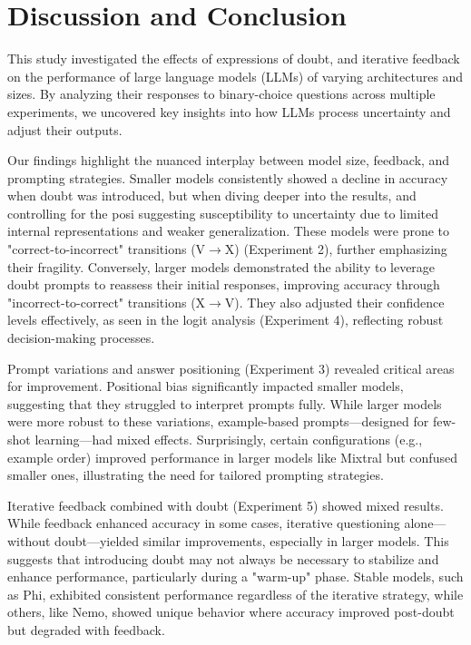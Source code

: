 \section{Discussion and Conclusion}

This study investigated the effects of expressions of doubt, and iterative feedback on the performance of large language models (LLMs) of varying architectures and sizes. By analyzing their responses to binary-choice questions across multiple experiments, we uncovered key insights into how LLMs process uncertainty and adjust their outputs.

Our findings highlight the nuanced interplay between model size, feedback, and prompting strategies. Smaller models consistently showed a decline in accuracy when doubt was introduced, but when diving deeper into the results, and controlling for the posi
 suggesting susceptibility to uncertainty due to limited internal representations and weaker generalization. These models were prone to "correct-to-incorrect" transitions (V$\to$X) (Experiment 2), further emphasizing their fragility. Conversely, larger models demonstrated the ability to leverage doubt prompts to reassess their initial responses, improving accuracy through "incorrect-to-correct" transitions (X$\to$V). They also adjusted their confidence levels effectively, as seen in the logit analysis (Experiment 4), reflecting robust decision-making processes.

Prompt variations and answer positioning (Experiment 3) revealed critical areas for improvement. Positional bias significantly impacted smaller models, suggesting that they struggled to interpret prompts fully. While larger models were more robust to these variations, example-based prompts—designed for few-shot learning—had mixed effects. Surprisingly, certain configurations (e.g., example order) improved performance in larger models like Mixtral but confused smaller ones, illustrating the need for tailored prompting strategies.

Iterative feedback combined with doubt (Experiment 5) showed mixed results. While feedback enhanced accuracy in some cases, iterative questioning alone—without doubt—yielded similar improvements, especially in larger models. This suggests that introducing doubt may not always be necessary to stabilize and enhance performance, particularly during a "warm-up" phase. Stable models, such as Phi, exhibited consistent performance regardless of the iterative strategy, while others, like Nemo, showed unique behavior where accuracy improved post-doubt but degraded with feedback.


